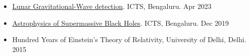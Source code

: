 \begin{itemize}
    \item \href{https://www.icts.res.in/discussion-meeting/LGWD}{Lunar Gravitational-Wave detection}. ICTS, Bengaluru. \hfill{Apr 2023}
    
    \item \href{https://www.icts.res.in/discussion-meeting/smbh2019}{Astrophysics of Supermassive Black Holes}. ICTS, Bengaluru. \hfill{Dec 2019}

    \item Hundred Years of Einstein's Theory of Relativity, University of Delhi, Delhi. \hfill{2015}

\end{itemize}